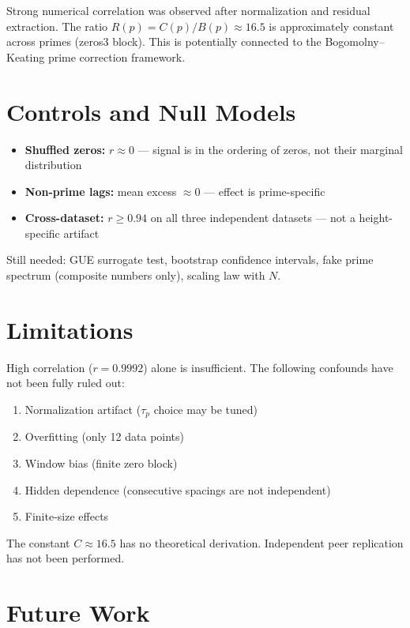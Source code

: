 \documentclass[11pt]{article}
\begin{document}
Strong numerical correlation was observed after normalization
and residual extraction. The ratio $R(p) = C(p)/B(p) \approx 16.5$
is approximately constant across primes (zeros3 block).
This is potentially connected to the Bogomolny--Keating
prime correction framework.

\section{Controls and Null Models}

\begin{itemize}
\item \textbf{Shuffled zeros:} $r \approx 0$ --- signal is in
  the ordering of zeros, not their marginal distribution
\item \textbf{Non-prime lags:} mean excess $\approx 0$ ---
  effect is prime-specific
\item \textbf{Cross-dataset:} $r \geq 0.94$ on all three
  independent datasets --- not a height-specific artifact
\end{itemize}

\noindent Still needed: GUE surrogate test,
bootstrap confidence intervals, fake prime spectrum
(composite numbers only), scaling law with $N$.

\section{Limitations}

High correlation ($r = 0.9992$) alone is insufficient.
The following confounds have not been fully ruled out:
\begin{enumerate}
\item Normalization artifact ($\tau_p$ choice may be tuned)
\item Overfitting (only 12 data points)
\item Window bias (finite zero block)
\item Hidden dependence (consecutive spacings are not independent)
\item Finite-size effects
\end{enumerate}

The constant $C \approx 16.5$ has no theoretical derivation.
Independent peer replication has not been performed.

\section{Future Work}
\end{document}

